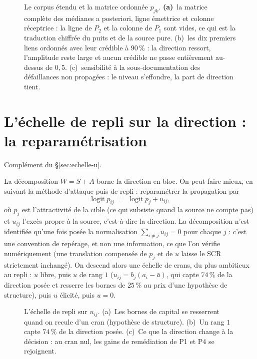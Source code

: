 \begin{figure}[htbp]
  \centering
  \caption{Le corpus étendu et la matrice ordonnée $p_{jk}$.
\textbf{(a)}~la matrice complète des médianes a posteriori, ligne émettrice et colonne
réceptrice : la ligne de $P_2$ et la colonne de $P_1$ sont vides, ce qui est la traduction
chiffrée du puits et de la source pure. (b)~les dix premiers liens ordonnés avec leur
crédible à $90\,\%$ : la direction ressort, l'amplitude reste large et aucun crédible ne passe
entièrement au-dessus de $0{,}5$. (c)~sensibilité à la sous-documentation des
défaillances non propagées : le niveau s'effondre, la part de direction tient.}
  \label{fig:corpus-etendu}
\end{figure}

\section{L'échelle de repli sur la direction : la reparamétrisation}
\label{sec:ann-echelle-u}


Complément du \S\ref{sec:echelle-u}.

La décomposition $W = S + A$ borne la direction en bloc. On peut faire mieux, en suivant
la méthode d'attaque puis de repli : reparamétrer la propagation par
\[
  \operatorname{logit} p_{ij} \;=\; \operatorname{logit} p_j + u_{ij},
\]
où $p_j$ est l'attractivité de la cible (ce qui subsiste quand la source ne compte
pas) et $u_{ij}$ l'excès propre à la source, c'est-à-dire la direction. La
décomposition n'est identifiée qu'une fois posée la normalisation $\sum_{i\neq j} u_{ij}=0$
pour chaque $j$ : c'est une convention de repérage, et non une information, ce que l'on
vérifie numériquement (une translation compensée de $p_j$ et de $u$ laisse le SCR
strictement inchangé). On descend alors une échelle de crans, du plus ambitieux au repli :
$u$ libre, puis $u$ de rang $1$ ($u_{ij}=b_j(a_i-\bar a)$, qui capte $74\,\%$ de
la direction posée et resserre les bornes de $25\,\%$ au prix d'une hypothèse de structure),
puis $u$ élicité, puis $u=0$.


\begin{figure}[htbp]
\centering
{}
\caption{L'échelle de repli sur $u_{ij}$. (a)~Les bornes de capital se resserrent quand on
recule d'un cran (hypothèse de structure). (b)~Un rang $1$ capte $74\,\%$ de la direction
posée. (c)~Ce que la direction change à la décision : au cran nul, les gains de remédiation
de P1 et P4 se rejoignent.}
\label{fig:echelle}
\end{figure}


